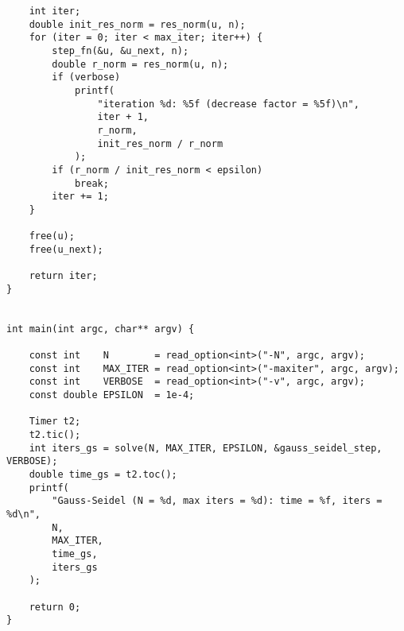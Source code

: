 \documentclass[11pt]{article}
\begin{document}
\begin{verbatim}
    int iter;
    double init_res_norm = res_norm(u, n);
    for (iter = 0; iter < max_iter; iter++) {
        step_fn(&u, &u_next, n);
        double r_norm = res_norm(u, n);
        if (verbose)
            printf(
                "iteration %d: %5f (decrease factor = %5f)\n", 
                iter + 1, 
                r_norm, 
                init_res_norm / r_norm
            );
        if (r_norm / init_res_norm < epsilon) 
            break;
        iter += 1;
    }

    free(u);
    free(u_next);

    return iter;
}


int main(int argc, char** argv) {

    const int    N        = read_option<int>("-N", argc, argv);
    const int    MAX_ITER = read_option<int>("-maxiter", argc, argv);
    const int    VERBOSE  = read_option<int>("-v", argc, argv);
    const double EPSILON  = 1e-4;
    
    Timer t2;
    t2.tic();
    int iters_gs = solve(N, MAX_ITER, EPSILON, &gauss_seidel_step, VERBOSE);
    double time_gs = t2.toc();
    printf(
        "Gauss-Seidel (N = %d, max iters = %d): time = %f, iters = %d\n", 
        N, 
        MAX_ITER, 
        time_gs, 
        iters_gs
    );

    return 0;
}
\end{verbatim}
\end{document}
